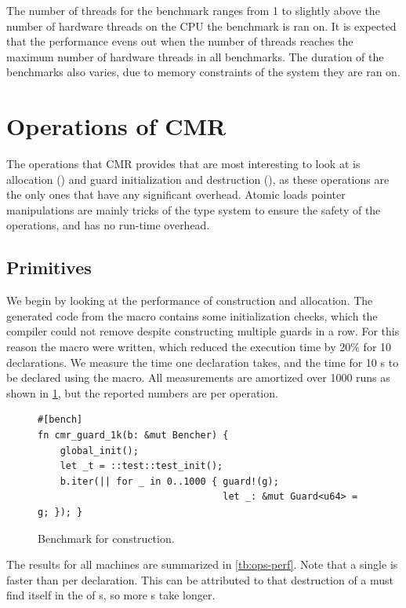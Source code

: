 The number of threads for the benchmark ranges from 1 to slightly above the number of hardware
threads on the CPU the benchmark is ran on. It is expected that the performance evens out when the
number of threads reaches the maximum number of hardware threads in all benchmarks. The duration of
the benchmarks also varies, due to memory constraints of the system they are ran on.


\section{Operations of CMR\label{ch:res-ops}}

The operations that CMR provides that are most interesting to look at is allocation
() and guard initialization and destruction (), as these operations
are the only ones that have any significant overhead. Atomic loads pointer manipulations are mainly
tricks of the type system to ensure the safety of the operations, and has no run-time overhead.


\subsection{Primitives}

We begin by looking at the performance of  construction and allocation.  The generated
code from the  macro contains some initialization checks, which the compiler could not
remove despite constructing multiple guards in a row. For this reason the  macro were
written, which reduced the execution time by 20\% for 10 declarations.  We measure the time one
 declaration takes, and the time for 10 s to be declared using the
 macro.  All measurements are amortized over 1000 runs as shown in
\cref{lst:guard-bench}, but the reported numbers are per operation.

\begin{figure}[ht]
\begin{lstlisting}[style=Rust]
#[bench]
fn cmr_guard_1k(b: &mut Bencher) {
    global_init();
    let _t = ::test::test_init();
    b.iter(|| for _ in 0..1000 { guard!(g);
                                 let _: &mut Guard<u64> = g; }); }
\end{lstlisting}
  \caption{Benchmark for  construction.\label{lst:guard-bench}}
\end{figure}

The results for all machines are summarized in \cref{tb:ops-perf}.
Note that a single  is faster than  per declaration. This can be
attributed to that destruction of a  must find itself in the  of
s, so more s take longer.


